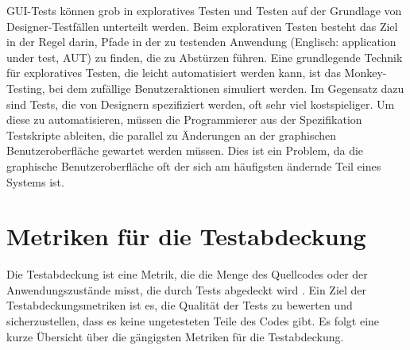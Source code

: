 GUI-Tests können grob in exploratives Testen und Testen auf der Grundlage von Designer-Testfällen unterteilt werden.
Beim explorativen Testen besteht das Ziel in der Regel darin, Pfade in der zu testenden Anwendung (Englisch: application under test, AUT) zu finden, die zu Abstürzen führen.
Eine grundlegende Technik für exploratives Testen, die leicht automatisiert werden kann, ist das Monkey-Testing, bei dem zufällige Benutzeraktionen simuliert werden.
Im Gegensatz dazu sind Tests, die von Designern spezifiziert werden, oft sehr viel kostspieliger.
Um diese zu automatisieren, müssen die Programmierer aus der Spezifikation Testskripte ableiten, die parallel zu Änderungen an der graphischen Benutzeroberfläche gewartet werden müssen.
Dies ist ein Problem, da die graphische Benutzeroberfläche oft der sich am häufigsten ändernde Teil eines Systems ist.

\section{Metriken für die Testabdeckung}
\label{sec:Foundations:TestCoverageMetrics}

Die Testabdeckung ist eine Metrik, die die Menge des Quellcodes oder der Anwendungszustände misst, die durch Tests abgedeckt wird \cite{Sommerville10}.
Ein Ziel der Testabdeckungsmetriken ist es, die Qualität der Tests zu bewerten  und sicherzustellen, dass es keine ungetesteten Teile des Codes gibt.
Es folgt eine kurze Übersicht über die gängigsten Metriken für die Testabdeckung.

